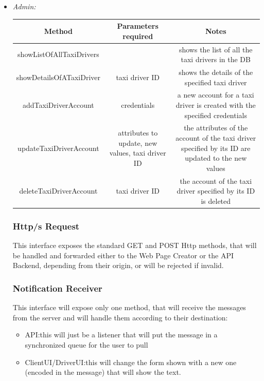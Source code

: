 \documentclass{article}
\begin{document}
\begin{itemize}
\begin{table}[H]
\begin{adjustbox}{width=1.2\textwidth}
\begin{tabular}{*{3}{c}}
				\bottomrule
			\end{tabular}
		\end{adjustbox}
	\end{table}		
	\item \textit{Admin:} \\
	\begin{table}[H]
		\begin{adjustbox}{width=1.2\textwidth}	
			\begin{tabular}{*{3}{c}}
				\toprule
				Method & Parameters required & Notes \\
				\midrule
				showListOfAllTaxiDrivers & & shows the list of all the taxi drivers in the DB\\
				showDetailsOfATaxiDriver & taxi driver ID & shows the details of the specified taxi driver\\
				addTaxiDriverAccount & credentials & a new account for a taxi driver is created with the specified credentials\\ 
				updateTaxiDriverAccount & attributes to update, new values, taxi driver ID & the attributes of the account of the taxi driver specified by its ID are updated to the new values\\ 
				deleteTaxiDriverAccount & taxi driver ID & the account of the taxi driver specified by its ID is deleted\\
				\bottomrule
			\end{tabular}
		\end{adjustbox}	
	\end{table}	
\subsubsection{Http/s Request} 
This interface exposes the standard GET and POST Http methods, that will be handled and forwarded either to the Web Page Creator or the API Backend, depending from their origin, or will be rejected if invalid.
\subsubsection{Notification Receiver}
This interface will expose only one method, that will receive the messages from the server and will handle them according to their destination: 
	\begin{itemize}
		\item API:\@ this will just be a listener that will put the message in a synchronized queue for the user to pull
		\item ClientUI/DriverUI:\@ this will change the form shown with a new one (encoded in the message) that will show the text. 
\end{itemize}
		

\end{itemize}
\end{document}
